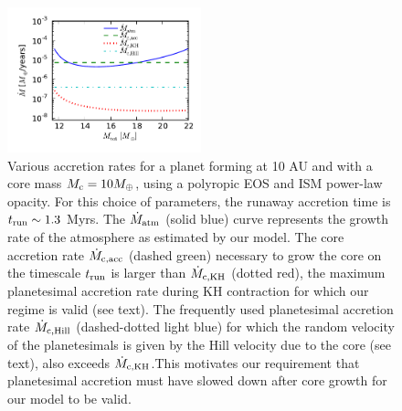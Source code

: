 \documentclass[apj]{emulateapj}
\newcommand{\co}{_{\rm c}}
\begin{document}
 \begin{figure}[h]
\centering
\includegraphics[width=0.5\textwidth]{../../figs/ModelAtmospheres/RadSelfGravRealEOS/PaperFigs/acc_rates_paper.pdf}
\caption{Various accretion rates for a planet forming at 10 AU and with a core mass $M\co=10 M_{\oplus}$, using a polyropic EOS and ISM power-law opacity. For this choice of parameters, the runaway accretion time is $t_{\rm run} \sim 1.3$ Myrs. The $\dot{M}_{\rm{atm}}$ (solid blue) curve represents the growth rate of the atmosphere as estimated by our model. The core accretion rate $\dot{M}_{\rm c, acc}$ (dashed green) necessary to grow the core on the timescale $t_{\rm run}$ is larger than $\dot{M}_{\rm c, KH}$ (dotted red), the maximum planetesimal accretion rate during KH contraction for which our regime is valid (see text). The frequently used planetesimal accretion rate $\dot{M}_{\rm c, Hill}$ (dashed-dotted light blue) for which the random velocity of the planetesimals is given by the Hill velocity due to the core (see text), also exceeds $\dot{M}_{\rm c, KH}$.This motivates our requirement  that planetesimal accretion must have slowed down after core growth for our model to be valid.}

\label{fig:accrates}
\end{figure}
\end{document}
